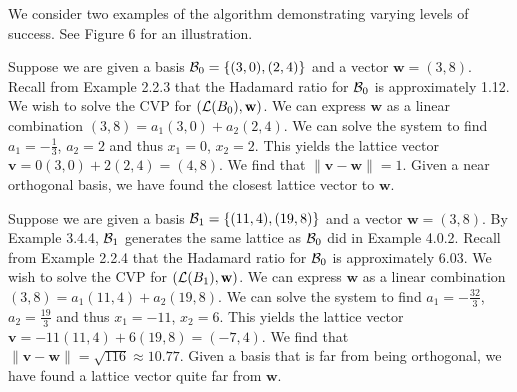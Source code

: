 \documentclass[a4paper,12pt]{article}
\begin{document}
We consider two examples of the algorithm demonstrating varying levels of success. See Figure 6 for an illustration.

\begin{ex}
Suppose we are given a basis $\mathcal{B}_0 = \lbrace (3,0), (2,4) \rbrace$ and a vector $\mathbf{w} = (3,8)$. Recall from Example 2.2.3 that the Hadamard ratio for $\mathcal{B}_0$ is approximately 1.12. We wish to solve the CVP for $(\mathcal{L}(B_0), \mathbf{w})$. We can express $\mathbf{w}$ as a linear combination $(3,8) = a_{1}(3,0) + a_{2}(2,4)$. We can solve the system to find $a_1 = -\frac{1}{3}$, $a_2 = 2$ and thus $x_1 = 0$, $x_2 = 2$. This yields the lattice vector $\mathbf{v} = 0(3,0) + 2(2,4) = (4,8)$. We find that $\| \mathbf{v} - \mathbf{w} \| = 1$. Given a near orthogonal basis, we have found the closest lattice vector to $\mathbf{w}$.  
\end{ex}

\begin{ex}
Suppose we are given a basis $\mathcal{B}_1 = \lbrace (11,4), (19,8) \rbrace$ and a vector $\mathbf{w} = (3,8)$. By Example 3.4.4, $\mathcal{B}_1$ generates the same lattice as $\mathcal{B}_0$ did in Example 4.0.2. Recall from Example 2.2.4 that the Hadamard ratio for $\mathcal{B}_0$ is approximately 6.03. We wish to solve the CVP for $(\mathcal{L}(B_1), \mathbf{w})$. We can express $\mathbf{w}$ as a linear combination $(3,8) = a_{1}(11,4) + a_{2}(19,8)$. We can solve the system to find $a_1 = -\frac{32}{3}$, $a_2 = \frac{19}{3}$ and thus $x_1 = -11$, $x_2 = 6$. This yields the lattice vector $\mathbf{v} = -11(11,4) + 6(19,8) = (-7,4)$. We find that $\| \mathbf{v} - \mathbf{w} \| = \sqrt{116} \approx 10.77$. Given a basis that is far from being orthogonal, we have found a lattice vector quite far from $\mathbf{w}$. 
\end{ex}
\end{document}
